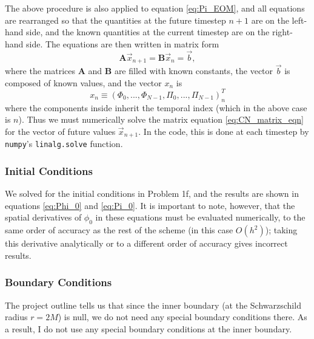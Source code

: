 \documentclass[12pt]{article}
\numberwithin{equation}{section}
\begin{document}
The above procedure is also applied to equation \ref{eq:Pi_EOM}, and all equations are rearranged so that the quantities at the future timestep $n+1$ are on the left-hand side, and the known quantities at the current timestep are on the right-hand side.  The equations are then written in matrix form
\begin{equation} \label{eq:CN_matrix_eqn}
\textbf{A} \vec{x}_{n+1} = \textbf{B} \vec{x}_{n} = \vec{b},
\end{equation}
where the matrices $\textbf{A}$ and $\textbf{B}$ are filled with known constants, the vector $\vec{b}$ is composed of known values, and the vector $x_n$ is
\begin{equation*}
x_{n} \equiv (\Phi_0, ..., \Phi_{N-1}, \Pi_0, ..., \Pi_{N-1})^T_{n}
\end{equation*}
where the components inside inherit the temporal index (which in the above case is $n$).  Thus we must numerically solve the matrix equation \ref{eq:CN_matrix_eqn} for the vector of future values $\vec{x}_{n+1}$.  In the code, this is done at each timestep by \texttt{numpy}'s \texttt{linalg.solve} function.

\subsubsection{Initial Conditions}
We solved for the initial conditions in Problem 1f, and the results are shown in equations \ref{eq:Phi_0} and \ref{eq:Pi_0}.  It is important to note, however, that the spatial derivatives of $\phi_0$ in these equations must be evaluated numerically, to the same order of accuracy as the rest of the scheme (in this case $O(h^2)$); taking this derivative analytically or to a different order of accuracy gives incorrect results.

\subsubsection{Boundary Conditions}
The project outline tells us that since the inner boundary (at the Schwarzschild radius $r = 2M$) is null, we do not need any special boundary conditions there.  As a result, I do not use any special boundary conditions at the inner boundary.
\end{document}
